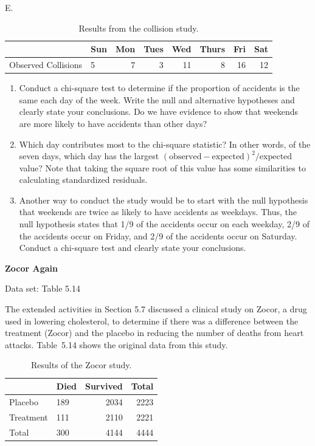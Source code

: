 \documentclass[
]{report}
\newcounter{excount}
\renewcommand{\theexcount}{E\arabic{excount}}
\begin{document}
\begin{list}{\theexcount.}{ \setlength{\itemsep}{0.5em}}
\begin{table}[!h]
\centering
\caption{\label{tab:tab13} Results from the collision study.}
\centering
\begin{tabular}[t]{llrrrrrr}
\toprule
  & Sun & Mon & Tues & Wed & Thurs & Fri & Sat\\
\midrule
Observed Collisions & 5 & 7 & 3 & 11 & 8 & 16 & 12\\
\bottomrule
\end{tabular}
\end{table}
  \begin{enumerate}
    \item Conduct a chi-square test to determine if the proportion of accidents is the same each day of the week. Write the null and alternative hypotheses and clearly state your conclusions. Do we have evidence to show that weekends are more likely to have accidents than other days?
    \item Which day contributes most to the chi-square statistic? In other words, of the seven days, which day has the largest \((\text{observed} - \text{expected})^2/\text{expected}\) value? Note that taking the square root of
this value has some similarities to calculating standardized residuals.
    \item Another way to conduct the study would be to start with the null hypothesis that weekends are twice as likely to have accidents as weekdays. Thus, the null hypothesis states that 1/9 of the accidents occur on each weekday, 2/9 of the accidents occur on Friday, and 2/9 of the accidents occur on Saturday. Conduct a chi-square test and clearly state your conclusions.
  \end{enumerate}

  \item \textbf{Zocor Again}    

  Data set: Table 5.14    
  
  The extended activities in Section 5.7 discussed a clinical study on Zocor, a drug used in lowering cholesterol, to determine if there was a difference between the treatment (Zocor) and the placebo in reducing the number of deaths from heart attacks. Table 5.14 shows the original data from this study.  
  
\begin{table}[!h]
\centering
\caption{\label{tab:tab14} Results of the Zocor study.}
\centering
\begin{tabular}[t]{llrr}
\toprule
  & Died & Survived & Total\\
\midrule
Placebo & 189 & 2034 & 2223\\
Treatment & 111 & 2110 & 2221\\
Total & 300 & 4144 & 4444\\
\bottomrule
\end{tabular}
\end{table}
  

\end{list}
\end{document}
